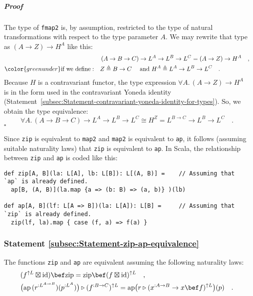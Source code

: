 \subparagraph{Proof}

The type of \lstinline!fmap2! is, by assumption, restricted to the
type of natural transformations with respect to the type parameter
$A$. We may rewrite that type as $(A\rightarrow Z)\rightarrow H^{A}$
like this:
\begin{align*}
 & \left(A\rightarrow B\rightarrow C\right)\rightarrow L^{A}\rightarrow L^{B}\rightarrow L^{C}=(A\rightarrow Z)\rightarrow H^{A}\quad,\\
{\color{greenunder}\text{if we define}:}\quad & Z\triangleq B\rightarrow C\quad\text{ and }H^{A}\triangleq L^{A}\rightarrow L^{B}\rightarrow L^{C}\quad.
\end{align*}
Because $H$ is a contravariant functor, the type expression $\forall A.\,(A\rightarrow Z)\rightarrow H^{A}$
is in the form used in the contravariant Yoneda identity (Statement~\ref{subsec:Statement-contravariant-yoneda-identity-for-types}).
So, we obtain the type equivalence:
\[
\forall A.\,\left(A\rightarrow B\rightarrow C\right)\rightarrow L^{A}\rightarrow L^{B}\rightarrow L^{C}\cong H^{Z}=L^{B\rightarrow C}\rightarrow L^{B}\rightarrow L^{C}\quad.
\]
 $\square$

Since \lstinline!zip! is equivalent to \lstinline!map2! and \lstinline!map2!
is equivalent to \lstinline!ap!, it follows (assuming suitable naturality
laws) that \lstinline!zip! is equivalent to \lstinline!ap!. In Scala,
the relationship between \lstinline!zip! and \lstinline!ap! is coded
like this:
\begin{lstlisting}
def zip[A, B](la: L[A], lb: L[B]): L[(A, B)] =    // Assuming that `ap` is already defined.
  ap[B, (A, B)](la.map {a => (b: B) => (a, b)} )(lb)

def ap[A, B](lf: L[A => B])(la: L[A]): L[B] =     // Assuming that `zip` is already defined.
  zip(lf, la).map { case (f, a) => f(a) }
\end{lstlisting}


\subsubsection{Statement \label{subsec:Statement-zip-ap-equivalence}\ref{subsec:Statement-zip-ap-equivalence}}

The functions \lstinline!zip! and \lstinline!ap! are equivalent
assuming the following naturality laws:
\begin{align*}
 & (f^{\uparrow L}\boxtimes\text{id})\bef\text{zip}=\text{zip}\bef(f\boxtimes\text{id})^{\uparrow L}\quad,\\
 & \big(\text{ap}\,(r^{:L^{A\rightarrow B}})(p^{:L^{A}})\big)\triangleright(f^{:B\rightarrow C})^{\uparrow L}=\text{ap}\big(r\triangleright(x^{:A\rightarrow B}\rightarrow x\bef f)^{\uparrow L}\big)(p)\quad.
\end{align*}


